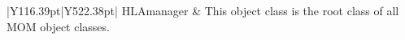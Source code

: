 \begin{landscape}
\begin{momtabletypeset}[8.00]
{{\begin{tabular}{|Y{116.39pt}|Y{522.38pt}|}
                    HLAmanager                                & This object class is the root class of all MOM object classes.\allowbreak{}                                                                                                                                                                                                                                                                                                                                                                                                                                                                                                                                                                                                                                                                                                                                                                                                                                                                                                                                                                                                                                                                                                                                                                                                                                                                                                                                                                                                                                                                                                                                                                                                                                                                                                                                                                                                                                                                                                                      \\
                    \hline

\end{tabular}}}
\end{momtabletypeset}
\end{landscape}

